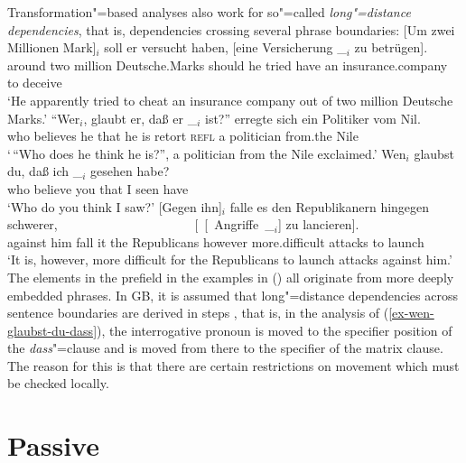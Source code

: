 Transformation"=based analyses also work for so"=called \emph{long"=distance dependencies}, that is, dependencies
crossing several phrase boundaries:
\eal
\label{bsp-Fernabhaengigkeit}
\ex\label{bsp-um-zwei-millionen}
\gll {}[Um zwei Millionen Mark]$_i$ soll er versucht haben, [eine Versicherung \_$_i$ zu betrügen].\footnotemark\\
     {}\spacebr{}around two million Deutsche.Marks should he tried have \spacebr{}an insurance.company {} to deceive\\
\glt `He apparently tried to cheat an insurance company out of two million Deutsche Marks.'
\ex
\gll "`Wer$_i$, glaubt er, daß er \_$_i$ ist?"' erregte sich ein Politiker vom Nil.\footnotemark\\
     \spacebr{}who believes he that he {} is retort \textsc{refl} a politician from.the Nile\\
\glt `\,``Who does he think he is?'', a politician from the Nile exclaimed.'
\ex\label{ex-wen-glaubst-du-dass}
\gll Wen$_i$ glaubst du, daß ich \_$_i$ gesehen habe?\footnotemark\\
     who believe you that I {} seen have\\
\glt `Who do you think I saw?'
\ex 
\gll {}[Gegen ihn]$_i$ falle es den Republikanern hingegen schwerer,~~~~~~~~~~~~~~~~~~~~~ [~[~Angriffe~\_$_i$] zu lancieren].\footnotemark\\
	 {}\spacebr{}against him fall it the Republicans however more.difficult \hspaceThis{[~[~}attacks to launch\\
\glt `It is, however, more difficult for the Republicans to launch attacks against him.'
\zl
The elements in the prefield in the examples in () all originate from more deeply embedded phrases. In GB,
it is assumed that long"=distance dependencies across sentence boundaries are derived in steps 
\citep[--79]{Grewendorf88a}, that is, in the analysis of (\ref{ex-wen-glaubst-du-dass}), the interrogative
pronoun is moved to the specifier position of the \emph{dass}"=clause and is moved from there to the specifier of
the matrix clause. The reason for this is that there are certain restrictions on movement which must be checked
locally.%

\section{Passive}
\label{Abschnitt-GB-Passiv}\label{sec-passive-gb}

